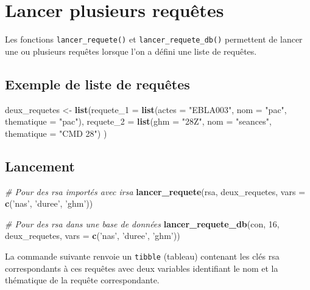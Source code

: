 \documentclass[]{book}
\newenvironment{Shaded}{\begin{snugshade}}{\end{snugshade}}
\newcommand{\KeywordTok}[1]{\textcolor[rgb]{0.13,0.29,0.53}{\textbf{#1}}}
\newcommand{\DataTypeTok}[1]{\textcolor[rgb]{0.13,0.29,0.53}{#1}}
\newcommand{\DecValTok}[1]{\textcolor[rgb]{0.00,0.00,0.81}{#1}}
\newcommand{\StringTok}[1]{\textcolor[rgb]{0.31,0.60,0.02}{#1}}
\newcommand{\CommentTok}[1]{\textcolor[rgb]{0.56,0.35,0.01}{\textit{#1}}}
\newcommand{\NormalTok}[1]{#1}
\theoremstyle{definition}
\theoremstyle{definition}
\theoremstyle{definition}
\theoremstyle{remark}
\begin{document}
\section{Lancer plusieurs requêtes}\label{lancer-plusieurs-requetes}

Les fonctions \texttt{lancer\_requete()} et
\texttt{lancer\_requete\_db()} permettent de lancer une ou plusieurs
requêtes lorsque l'on a défini une liste de requêtes.

\subsection{Exemple de liste de
requêtes}\label{exemple-de-liste-de-requetes}

\begin{Shaded}
\begin{Highlighting}[]
\NormalTok{deux_requetes <-}\StringTok{ }\KeywordTok{list}\NormalTok{(}\DataTypeTok{requete_1 =} \KeywordTok{list}\NormalTok{(}\DataTypeTok{actes =} \StringTok{"EBLA003"}\NormalTok{, }\DataTypeTok{nom =} \StringTok{"pac"}\NormalTok{, }\DataTypeTok{thematique =} \StringTok{"pac"}\NormalTok{),}
                      \DataTypeTok{requete_2 =} \KeywordTok{list}\NormalTok{(}\DataTypeTok{ghm =} \StringTok{"28Z"}\NormalTok{, }\DataTypeTok{nom =} \StringTok{"seances"}\NormalTok{, }\DataTypeTok{thematique =} \StringTok{"CMD 28"}\NormalTok{)}
\NormalTok{)}
\end{Highlighting}
\end{Shaded}

\subsection{Lancement}\label{lancement}

\begin{Shaded}
\begin{Highlighting}[]
\CommentTok{# Pour des rsa importés avec irsa}
\KeywordTok{lancer_requete}\NormalTok{(rsa, deux_requetes, }\DataTypeTok{vars =} \KeywordTok{c}\NormalTok{(}\StringTok{'nas'}\NormalTok{, }\StringTok{'duree'}\NormalTok{, }\StringTok{'ghm'}\NormalTok{))}

\CommentTok{# Pour des rsa dans une base de données}
\KeywordTok{lancer_requete_db}\NormalTok{(con, }\DecValTok{16}\NormalTok{, deux_requetes, }\DataTypeTok{vars =} \KeywordTok{c}\NormalTok{(}\StringTok{'nas'}\NormalTok{, }\StringTok{'duree'}\NormalTok{, }\StringTok{'ghm'}\NormalTok{))}
\end{Highlighting}
\end{Shaded}

La commande suivante renvoie un \texttt{tibble} (tableau) contenant les
clés rsa correspondants à ces requêtes avec deux variables identifiant
le nom et la thématique de la requête correspondante.
\end{document}
